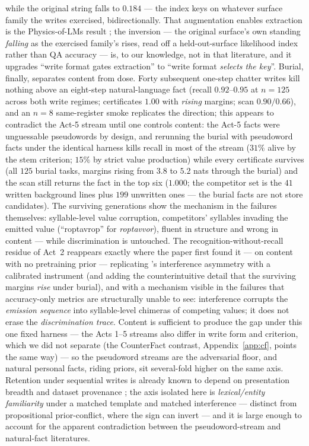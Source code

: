 \documentclass[11pt]{article}
\begin{document}
while the original string falls to $0.184$ --- the index keys on whatever surface family
the writes exercised, bidirectionally. That augmentation enables extraction is the
Physics-of-LMs result \citep{allenzhu2024}; the inversion --- the original surface's own
standing \emph{falling} as the exercised family's rises, read off a held-out-surface
likelihood index rather than QA accuracy --- is, to our knowledge, not in that literature,
and it upgrades ``write format gates extraction'' to ``write format \emph{selects the
key}''. Burial, finally, separates content from dose. Forty
subsequent one-step chatter writes kill nothing above an eight-step natural-language fact
(recall $0.92$--$0.95$ at $n{=}125$ across both write regimes; certificates $1.00$ with
\emph{rising} margins; scan $0.90/0.66$), and an $n{=}8$ same-register smoke replicates
the direction; this appears to contradict the Act-5 stream until
one controls content: the Act-5 facts were unguessable pseudowords by design, and
rerunning the burial with pseudoword facts under the identical harness kills recall in most
of the stream ($31\%$ alive by the stem criterion; $15\%$ by strict value production)
while every certificate survives (all $125$ burial tasks, margins rising from $3.8$ to
$5.2$ nats through the burial) and the scan still returns the fact in the top six
($1.000$; the competitor set is the $41$ written background lines plus $199$ unwritten
ones --- the burial facts are not store candidates). The surviving generations show the mechanism in the failures themselves:
syllable-level value corruption, competitors' syllables invading the emitted value
(``roptavrop'' for \emph{roptavvor}), fluent in structure and wrong in content --- while
discrimination is untouched. The recognition-without-recall residue of Act~2
reappears exactly where the paper first found it --- on content with no pretraining
prior --- replicating \citet{orhan2023recognition}'s interference asymmetry with a
calibrated instrument (and adding the counterintuitive detail that the surviving margins
\emph{rise} under burial), and with a mechanism visible in the failures that
accuracy-only metrics are structurally unable to see: interference corrupts the
\emph{emission sequence} into syllable-level chimeras of competing values; it does not
erase the \emph{discrimination trace}. Content is
sufficient to produce the gap under this one fixed harness --- the Acts 1--5 streams also
differ in write form and criterion, which we did not separate (the CounterFact contrast,
Appendix~\ref{app:cf}, points the same way) --- so the pseudoword streams are the
adversarial floor, and natural personal facts, riding priors, sit several-fold higher on
the same axis. Retention under sequential writes is already known to depend on
presentation breadth \citep{oneill2026continual} and dataset provenance
\citep{chen2024remix}; the axis isolated here is \emph{lexical/entity familiarity} under a
matched template and matched interference --- distinct from propositional prior-conflict,
where the sign can invert \citep{oneill2026continual} --- and it is large enough to
account for the apparent contradiction between the pseudoword-stream and natural-fact
literatures.
\end{document}
